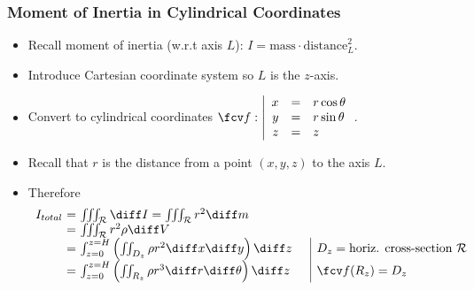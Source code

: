 \begin{frame}
\frametitle{Moment of Inertia in Cylindrical Coordinates}
\begin{itemize}
\item Recall moment of inertia (w.r.t axis $L$): $I = \text{mass} \cdot \text{distance}_L^2$.
\item Introduce Cartesian coordinate system so $L$ is the $z$-axis.
\item Convert to cylindrical coordinates $\fcv f: \left| \begin{array}{rcl} x & =& r\cos \theta\\ y&=&r\sin \theta\\ z&=&z \end{array} \right.$.
\item Recall that $r$ is the distance from a point $(x,y,z)$ to the axis $L$. 
\item Therefore
\[
\begin{array}{r@{~}c@{~}ll|l}
I_{total}&=& \iiint_{\mathcal{R}} \diff I = \iiint_{\mathcal{R}} r^2 \diff m \\
&=&\iiint_{\mathcal{R}} r^2  \rho  \diff V \\
&=& \int_{z=0}^{z=H} \left( \iint_{D_z} \rho r^2  \diff x\diff y \right)  \diff z  && D_z=\text{horiz. cross-section }\mathcal R\\
&=& \int_{z=0}^{z=H} \left( \iint_{R_z} \rho r^3  \diff r\diff \theta \right)  \diff z && \fcv f(R_z)=D_z
\end{array}
\]
\end{itemize}
\end{frame}